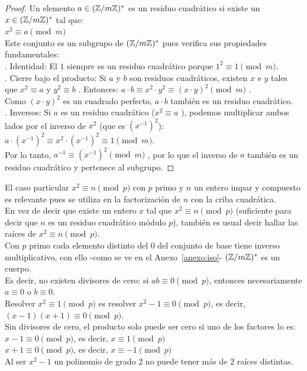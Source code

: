 \begin{proof} Un elemento $a \in (\mathbb{Z}/m\mathbb{Z})^*$  es un residuo cuadrático si existe un $ x \in (\mathbb{Z}/m\mathbb{Z} )^*$  tal que: \\
$ x^{2}\equiv a \pmod m$ \\
Este conjunto  es un subgrupo de $ (\mathbb{Z}/m\mathbb{Z} )^*$ pues verifica sus propiedades fundamentales: \\
. Identidad: El $1$  siempre es un residuo cuadrático porque $1^2 \equiv 1 \pmod m$. \\
. Cierre bajo el producto: Si $a$  y $ b$  son residuos cuadráticos, existen $ x$  e $ y$  tales que $x^2 \equiv a$  y $y^2 \equiv b$ . Entonces: $a \cdot b\equiv x^{2}\cdot y^{2}\equiv (x\cdot y)^{2} \pmod m$ .\\
Como $ (x \cdot y)^2$  es un cuadrado perfecto, $ a \cdot b$  también es un residuo cuadrático. \\
. Inversos: Si $a$  es un residuo cuadrático ($x^2 \equiv a$ ), podemos multiplicar ambos lados por el inverso de $x^{2}$  (que es $(x^{-1})^2$): $a\cdot (x^{-1})^{2}\equiv x^{2}\cdot (x^{-1})^{2}\equiv 1 \pmod m$. \\ 
Por lo tanto, $a^{-1} \equiv (x^{-1})^2 \pmod m$ , por lo que el inverso de $a$  también es un residuo cuadrático y pertenece al subgrupo.
\end{proof}

El caso particular  $x^2  \equiv n \pmod {p}$ con $p$ primo y $n$ un entero impar y compuesto es relevante pues se utiliza en la factorización de $n$ con la criba cuadrática. \\

En vez de decir que existe un entero $x$ tal que $x^2  \equiv n \pmod {p}$ (suficiente para decir que $n$ es un residuo cuadrático módulo $p$), también es usual decir hallar las raíces de $x^2  \equiv n \pmod {p}$. \\
Con $p$ primo cada elemento distinto del 0 del conjunto de base tiene inverso multiplicativo, con ello -como se ve en el Anexo~\ref{anexo:iso}- $(\mathbb{Z}/m\mathbb{Z})^{*}$ es un cuerpo. \\
Es decir, no existen divisores de cero: si $ab \equiv 0 \pmod{p}$, entonces necesariamente $a \equiv 0$ o $b \equiv 0$. \\

Resolver $x^2 \equiv 1 \pmod{p}$ es resolver $x^2 - 1 \equiv 0 \pmod{p}$, es decir, $(x-1)(x+1) \equiv 0 \pmod{p}$. \\
Sin divisores de cero, el producto solo puede ser cero si uno de los factores lo es: \\
$x-1 \equiv 0 \pmod{p}$, es decir, $x \equiv 1 \pmod{p}$ \\
$x+1 \equiv 0 \pmod{p}$, es decir, $x \equiv -1 \pmod{p}$ \\
Al ser $x^2 - 1$ un polinomio de grado 2 no puede tener más de 2 raíces distintas.

